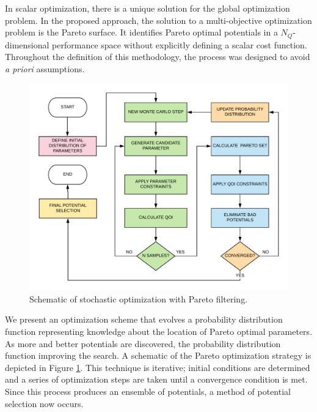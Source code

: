 In scalar optimization, there is a unique solution for the global optimization problem.   In the proposed approach, the solution to a multi-objective optimization problem is the Pareto surface.  It identifies Pareto optimal potentials in a $N_Q$-dimensional performance space without explicitly defining a scalar cost function.  Throughout the definition of this methodology, the process was designed to avoid \emph{a priori} assumptions.


\begin{figure}[ht]
	\centering
	\includegraphics{chapter5/img/pareto_optimization}
	\caption{Schematic of stochastic optimization with Pareto filtering.}
	\label{fig:pareto_optimization}
\end{figure}

We present an optimization scheme that evolves a probability distribution function representing knowledge about the location of Pareto optimal parameters.  As more and better potentials are discovered, the probability distribution function improving the search.  A schematic of the Pareto optimization strategy is depicted in Figure \ref{fig:pareto_optimization}.  This technique is iterative; initial conditions are determined and a series of optimization steps are taken until a convergence condition is met.  Since this process produces an ensemble of potentials, a method of potential selection now occurs.

